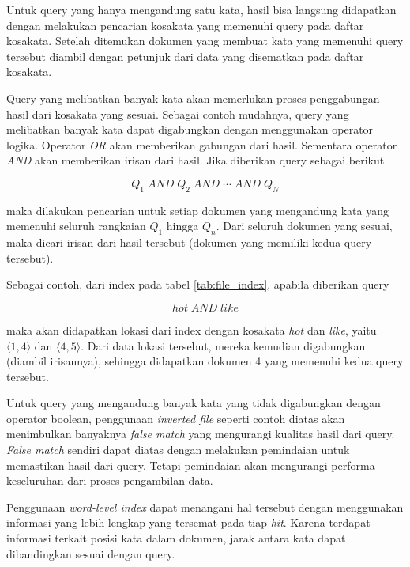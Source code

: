 Untuk query yang hanya mengandung satu kata, hasil bisa langsung didapatkan
dengan melakukan pencarian kosakata yang memenuhi query pada daftar kosakata.
Setelah ditemukan dokumen yang membuat kata yang memenuhi query tersebut diambil
dengan petunjuk dari data yang disematkan pada daftar kosakata.

Query yang melibatkan banyak kata akan memerlukan proses penggabungan hasil dari
kosakata yang sesuai. Sebagai contoh mudahnya, query yang melibatkan banyak kata
dapat digabungkan dengan menggunakan operator logika. Operator \textit{OR} akan
memberikan gabungan dari hasil. Sementara operator \textit{AND} akan memberikan
irisan dari hasil. Jika diberikan query sebagai berikut

\[
  Q_1 \;\textit{AND} \;Q_2 \;\textit{AND} \;\cdots{} \;\textit{AND} \;Q_N
\]

maka dilakukan pencarian untuk setiap dokumen yang mengandung kata yang memenuhi
seluruh rangkaian $Q_1$ hingga $Q_n$. Dari seluruh dokumen yang sesuai, maka
dicari irisan dari hasil tersebut (dokumen yang memiliki kedua query tersebut).

Sebagai contoh, dari index pada tabel \ref{tab:file_index}, apabila diberikan
query

\[
  hot\; \textit{AND} \;like
\]

maka akan didapatkan lokasi dari index dengan kosakata \textit{hot} dan
\textit{like}, yaitu $\langle{}1, 4 \rangle{}$ dan $\langle{}4, 5 \rangle{}$.
Dari data lokasi tersebut, mereka kemudian digabungkan (diambil irisannya),
sehingga didapatkan dokumen 4 yang memenuhi kedua query tersebut.

Untuk query yang mengandung banyak kata yang tidak digabungkan dengan operator
boolean, penggunaan \textit{inverted file} seperti contoh diatas akan
menimbulkan banyaknya \textit{false match} yang mengurangi kualitas hasil dari
query. \textit{False match} sendiri dapat diatas dengan melakukan pemindaian
untuk memastikan hasil dari query. Tetapi pemindaian akan mengurangi performa
keseluruhan dari proses pengambilan data.

Penggunaan \textit{word-level index} dapat menangani hal tersebut dengan
menggunakan informasi yang lebih lengkap yang tersemat pada tiap \textit{hit}.
Karena terdapat informasi terkait posisi kata dalam dokumen, jarak antara kata
dapat dibandingkan sesuai dengan query.

%

